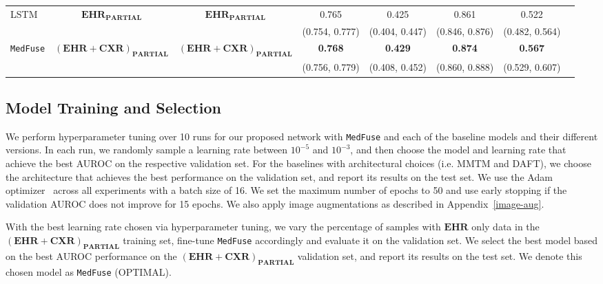 \documentclass[pmlr]{jmlr}
\begin{document}
\begin{table*}[t!]
{\begin{tabular}{l c c c c| c c c}
        \hline
     LSTM &   $\mathbf{EHR}_{\mathbf{PARTIAL}}$  & $\mathbf{EHR}_{\mathbf{PARTIAL}}$  & 0.765   & 0.425  & 0.861   &0.522  \\
      &  &   &  (0.754, 0.777)  &  (0.404, 0.447) &(0.846, 0.876)  & (0.482, 0.564) \\
\texttt{MedFuse} & $\mathbf{(EHR+CXR)}_{\mathbf{PARTIAL}}$  & $\mathbf{(EHR+CXR)}_{\mathbf{PARTIAL}}$ & \textbf{0.768}  & \textbf{0.429} & \textbf{0.874}  &\textbf{0.567}  \\
        &   &  &  (0.756, 0.779) &  (0.408, 0.452)& (0.860, 0.888) & (0.529, 0.607) \\
       \bottomrule
    \end{tabular}}
    \label{tab:univsmulti} \vspace{-3mm}
\end{table*}


\subsection{Model Training and Selection}
We perform hyperparameter tuning over 10 runs for our proposed network with \texttt{MedFuse} and each of the baseline models and their different versions. In each run, we randomly sample a learning rate between $10^{-5}$ and $10^{-3}$, and then choose the model and learning rate that achieve the best AUROC on the respective validation set. For the baselines with architectural choices (i.e. MMTM and DAFT), we choose the architecture that achieves the best performance on the validation set, and report its results on the test set. We use the Adam optimizer~\citep{kingma2014adam} across all experiments with a batch size of 16. We set the maximum number of epochs to 50 and use early stopping if the validation AUROC does not improve for 15 epochs. We also apply image augmentations as described in Appendix~\ref{image-aug}. 




With the best learning rate chosen via hyperparameter tuning, we vary the percentage of samples with $\mathbf{EHR}$ only data in the $(\mathbf{EHR+CXR})_{\mathbf{PARTIAL}}$ training set, fine-tune \texttt{MedFuse} accordingly and evaluate it on the validation set. We select the best model based on the best AUROC performance on the $(\mathbf{EHR+CXR})_{\mathbf{PARTIAL}}$ validation set, and report its results on the test set. We denote this chosen model as \texttt{MedFuse} (OPTIMAL). 
\end{document}
